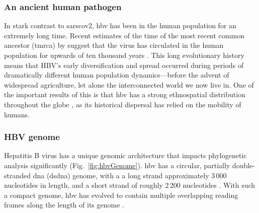 \subsubsection{An ancient human pathogen}
In stark contrast to \gls{sarscov2}, \gls{hbv} has been in the human population for an extremely long time.
Recent estimates of the time of the most recent common ancestor (\gls{tmrca}) by \citet{kocher2021ten} suggest that the virus has circulated in the human population for upwards of ten thousand years \citep{kocher2021ten}.
This long evolutionary history means that HBV's early diversification and spread occurred during periods of dramatically different human population dynamics---before the advent of widespread agriculture, let alone the interconnected world we now live in. 
One of the important results of this is that \gls{hbv} has a strong ethnospatial distribution throughout the globe \citep{sunbul2014hepatitis}, as its historical dispersal has relied on the mobility of humans.



\subsubsection{HBV genome}
Hepatitis B virus has a unique genomic architecture that impacts phylogenetic analysis significantly (Fig.~\ref{fig:hbvGenome}).
\gls{hbv} has a circular, partially double-stranded \gls{dna} (ds\gls{dna}) genome, with a a long strand approximately 3\,000 nucleotides in length, and a short strand of roughly 2\,200 nucleotides \citep{mcnaughton2019insights}.
With such a compact genome, \gls{hbv} has evolved to contain multiple overlapping reading frames along the length of its genome \citep{mcnaughton2019insights}.

